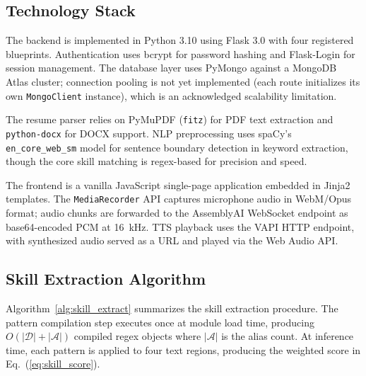 \documentclass[conference]{IEEEtran}
\begin{document}
\subsection{Technology Stack}

The backend is implemented in Python 3.10 using Flask 3.0 with four registered blueprints. Authentication uses bcrypt for password hashing and Flask-Login for session management. The database layer uses PyMongo against a MongoDB Atlas cluster; connection pooling is not yet implemented (each route initializes its own \texttt{MongoClient} instance), which is an acknowledged scalability limitation.

The resume parser relies on PyMuPDF (\texttt{fitz}) for PDF text extraction and \texttt{python-docx} for DOCX support. NLP preprocessing uses spaCy's \texttt{en\_core\_web\_sm} model for sentence boundary detection in keyword extraction, though the core skill matching is regex-based for precision and speed.

The frontend is a vanilla JavaScript single-page application embedded in Jinja2 templates. The \texttt{MediaRecorder} API captures microphone audio in WebM/Opus format; audio chunks are forwarded to the AssemblyAI WebSocket endpoint as base64-encoded PCM at 16~kHz. TTS playback uses the VAPI HTTP endpoint, with synthesized audio served as a URL and played via the Web Audio API.

\subsection{Skill Extraction Algorithm}

Algorithm~\ref{alg:skill_extract} summarizes the skill extraction procedure. The pattern compilation step executes once at module load time, producing $O(|\mathcal{D}| + |\mathcal{A}|)$ compiled regex objects where $|\mathcal{A}|$ is the alias count. At inference time, each pattern is applied to four text regions, producing the weighted score in Eq.~(\ref{eq:skill_score}).
\end{document}
